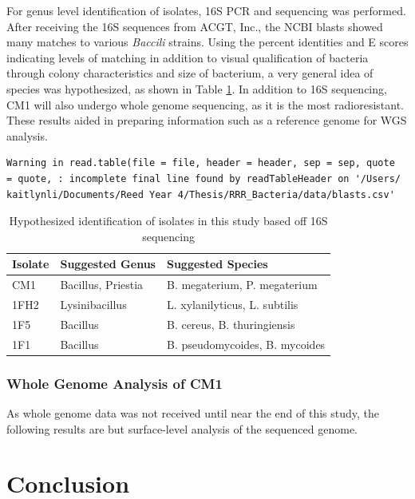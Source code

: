 \documentclass[12pt,twoside]{reedthesis}
\begin{document}
For genus level identification of isolates, 16S PCR and sequencing was performed. After receiving the 16S sequences from ACGT, Inc., the NCBI blasts showed many matches to various \emph{Baccili} strains. Using the percent identities and E scores indicating levels of matching in addition to visual qualification of bacteria through colony characteristics and size of bacterium, a very general idea of species was hypothesized, as shown in Table \ref{tab:blasts}. In addition to 16S sequencing, CM1 will also undergo whole genome sequencing, as it is the most radioresistant. These results aided in preparing information such as a reference genome for WGS analysis.
\begin{verbatim}
Warning in read.table(file = file, header = header, sep = sep, quote
= quote, : incomplete final line found by readTableHeader on '/Users/
kaitlynli/Documents/Reed Year 4/Thesis/RRR_Bacteria/data/blasts.csv'
\end{verbatim}
\begin{longtable}[t]{lll}
\caption[Hypothesized Identification]{\label{tab:blasts}Hypothesized identification of isolates in this study based off 16S sequencing}\\
\toprule
Isolate & Suggested Genus & Suggested Species\\
\midrule
CM1 & Bacillus, Priestia & B. megaterium, P. megaterium\\
1FH2 & Lysinibacillus & L. xylanilyticus, L. subtilis\\
1F5 & Bacillus & B. cereus, B. thuringiensis\\
1F1 & Bacillus & B. pseudomycoides, B. mycoides\\
\bottomrule
\end{longtable}
\hypertarget{whole-genome-analysis-of-cm1}{%
\subsection{Whole Genome Analysis of CM1}\label{whole-genome-analysis-of-cm1}}

As whole genome data was not received until near the end of this study, the following results are but surface-level analysis of the sequenced genome.

\hypertarget{conclusion}{%
\chapter{Conclusion}\label{conclusion}}
\end{document}
